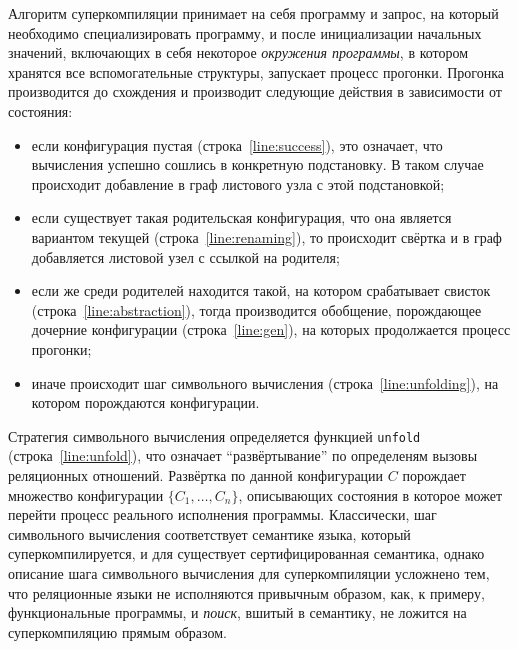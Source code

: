 Алгоритм суперкомпиляции принимает на себя программу и запрос,
на который необходимо специализировать программу, и после
инициализации начальных значений, включающих в себя некоторое \emph{окружения программы},
в котором хранятся все вспомогательные структуры, запускает процесс прогонки.
Прогонка производится до схождения и производит следующие действия в
зависимости от состояния:
\begin{itemize}
\item если конфигурация пустая (строка~\ref{line:success}), это означает, что вычисления
      успешно сошлись в конкретную подстановку. В таком случае происходит добавление
      в граф листового узла с этой подстановкой;
\item если существует такая родительская конфигурация, что она является вариантом текущей (строка~\ref{line:renaming}),
      то происходит свёртка и в граф добавляется листовой узел с ссылкой на родителя;
\item если же среди родителей находится такой, на котором срабатывает свисток (строка~\ref{line:abstraction}),
      тогда производится обобщение, порождающее дочерние конфигурации (строка~\ref{line:gen}),
      на которых продолжается процесс прогонки;
\item иначе происходит шаг символьного вычисления (строка~\ref{line:unfolding}), на котором
      порождаются конфигурации.

\end{itemize}

Стратегия символьного вычисления определяется функцией \lstinline{unfold}
(строка~\ref{line:unfold}), что означает ``развёртывание'' по определеням вызовы реляционных отношений.
Развёртка по данной конфигурации $C$ порождает
множество конфигурации $\{ C_1, \dots, C_n \}$, описывающих состояния в которое может перейти
процесс реального исполнения программы. Классически, шаг символьного
вычисления соответствует семантике языка, который суперкомпилируется,
и для \ukanren существует сертифицированная семантика\cite{semanticMK},
однако описание шага символьного вычисления \ukanren для суперкомпиляции 
усложнено тем, что реляционные языки не исполняются привычным образом,
как, к примеру, функциональные программы, и \emph{поиск}, вшитый в семантику,
не ложится на суперкомпиляцию прямым образом.

